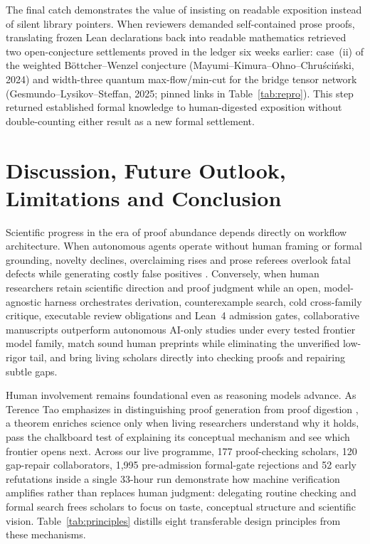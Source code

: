 \documentclass[11pt,a4paper]{article}
\begin{document}
The final catch demonstrates the value of insisting on readable exposition
instead of silent library pointers. When reviewers demanded self-contained
prose proofs, translating frozen Lean declarations back into readable
mathematics retrieved two open-conjecture settlements proved in the ledger six
weeks earlier: case~(ii) of the weighted B\"ottcher--Wenzel conjecture
(Mayumi--Kimura--Ohno--Chru\'sci\'nski, 2024) and width-three quantum
max-flow/min-cut for the bridge tensor network (Gesmundo--Lysikov--Steffan,
2025; pinned links in Table~\ref{tab:repro}). This step returned established
formal knowledge to human-digested exposition without double-counting either
result as a new formal settlement.

\section{Discussion, Future Outlook, Limitations and Conclusion}
\label{sec:discussion}
Scientific progress in the era of proof abundance depends directly on workflow
architecture. When autonomous agents operate without human framing or formal
grounding, novelty declines, overclaiming rises and prose referees overlook
fatal defects while generating costly false positives
\citep{societyai,oh2026slop,nguyen2026review,sun2026obligation}. Conversely,
when human researchers retain scientific direction and proof judgment while an
open, model-agnostic harness orchestrates derivation, counterexample search,
cold cross-family critique, executable review obligations and Lean~4 admission
gates, collaborative manuscripts outperform autonomous AI-only studies under
every tested frontier model family, match sound human preprints while
eliminating the unverified low-rigor tail, and bring living scholars directly
into checking proofs and repairing subtle gaps.

Human involvement remains foundational even as reasoning models advance. As
Terence Tao emphasizes in distinguishing proof generation from proof digestion
\citep{tao2026age}, a theorem enriches science only when living researchers
understand why it holds, pass the chalkboard test of explaining its conceptual
mechanism and see which frontier opens next. Across our live programme, 177
proof-checking scholars, 120 gap-repair collaborators, 1,995 pre-admission
formal-gate rejections and 52 early refutations inside a single 33-hour run
demonstrate how machine verification amplifies rather than replaces human
judgment: delegating routine checking and formal search frees scholars to focus
on taste, conceptual structure and scientific vision. Table~\ref{tab:principles}
distills eight transferable design principles from these mechanisms.
\end{document}
